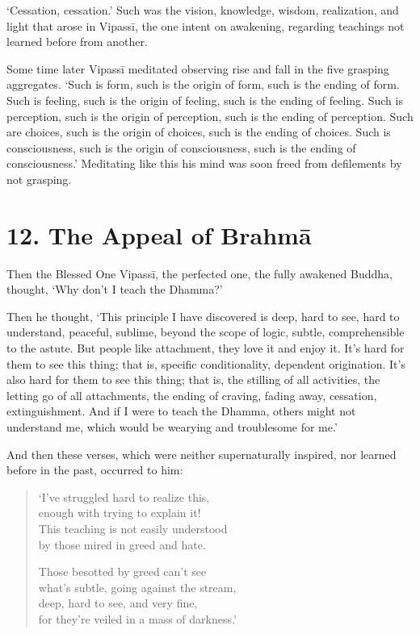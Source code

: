 \documentclass[12pt,openany]{book}%
\begin{document}
‘Cessation, cessation.’ Such was the vision, knowledge, wisdom, realization, and light that arose in \textsanskrit{Vipassī}, the one intent on awakening, regarding teachings not learned before from another. 

Some time later \textsanskrit{Vipassī} meditated observing rise and fall in the five grasping aggregates. ‘Such is form, such is the origin of form, such is the ending of form. Such is feeling, such is the origin of feeling, such is the ending of feeling. Such is perception, such is the origin of perception, such is the ending of perception. Such are choices, such is the origin of choices, such is the ending of choices. Such is consciousness, such is the origin of consciousness, such is the ending of consciousness.’ Meditating like this his mind was soon freed from defilements by not grasping. 

\section*{12. The Appeal of \textsanskrit{Brahmā} }

Then the Blessed One \textsanskrit{Vipassī}, the perfected one, the fully awakened Buddha, thought, ‘Why don’t I teach the Dhamma?’ 

Then he thought, ‘This principle I have discovered is deep, hard to see, hard to understand, peaceful, sublime, beyond the scope of logic, subtle, comprehensible to the astute. But people like attachment, they love it and enjoy it. It’s hard for them to see this thing; that is, specific conditionality, dependent origination. It’s also hard for them to see this thing; that is, the stilling of all activities, the letting go of all attachments, the ending of craving, fading away, cessation, extinguishment. And if I were to teach the Dhamma, others might not understand me, which would be wearying and troublesome for me.’ 

And then these verses, which were neither supernaturally inspired, nor learned before in the past, occurred to him: 

\begin{verse}%
‘I’ve struggled hard to realize this, \\
enough with trying to explain it! \\
This teaching is not easily understood \\
by those mired in greed and hate. 

Those besotted by greed can’t see \\
what’s subtle, going against the stream, \\
deep, hard to see, and very fine, \\
for they’re veiled in a mass of darkness.’ 

%
\end{verse}
\end{document}
